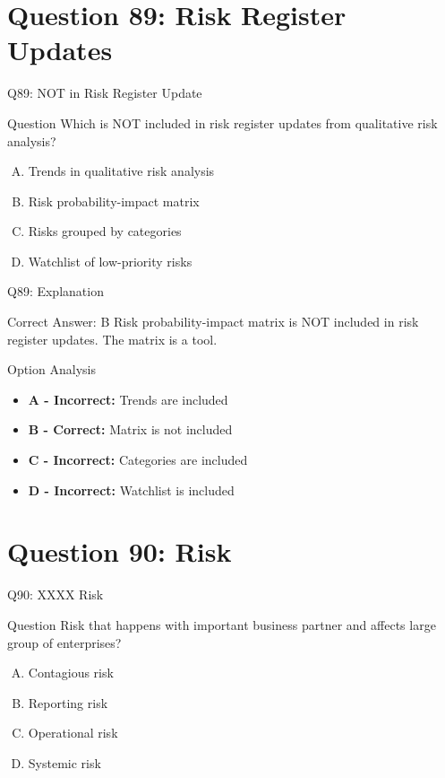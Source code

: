 \documentclass{beamer}
\begin{document}
	\section{Question 89: Risk Register Updates}
	
	\begin{frame}{Q89: NOT in Risk Register Update}
		\begin{block}{Question}
			Which is NOT included in risk register updates from qualitative risk analysis?
		\end{block}
		\begin{enumerate}[(A)]
			\item Trends in qualitative risk analysis
			\item Risk probability-impact matrix
			\item Risks grouped by categories
			\item Watchlist of low-priority risks
		\end{enumerate}
	\end{frame}
	
	\begin{frame}{Q89: Explanation}
		\begin{block}{Correct Answer: B}
			Risk probability-impact matrix is NOT included in risk register updates. The matrix is a tool.
		\end{block}
		\begin{block}{Option Analysis}
			\begin{itemize}
				\item \textbf{A - Incorrect:} Trends are included
				\item \textbf{B - Correct:} Matrix is not included
				\item \textbf{C - Incorrect:} Categories are included
				\item \textbf{D - Incorrect:} Watchlist is included
			\end{itemize}
		\end{block}
	\end{frame}
	
	\section{Question 90: Risk}
	
	\begin{frame}{Q90: XXXX Risk}
		\begin{block}{Question}
			Risk that happens with important business partner and affects large group of enterprises?
		\end{block}
		\begin{enumerate}[(A)]
			\item Contagious risk
			\item Reporting risk
			\item Operational risk
			\item Systemic risk
		\end{enumerate}
	\end{frame}
	
\end{document}
